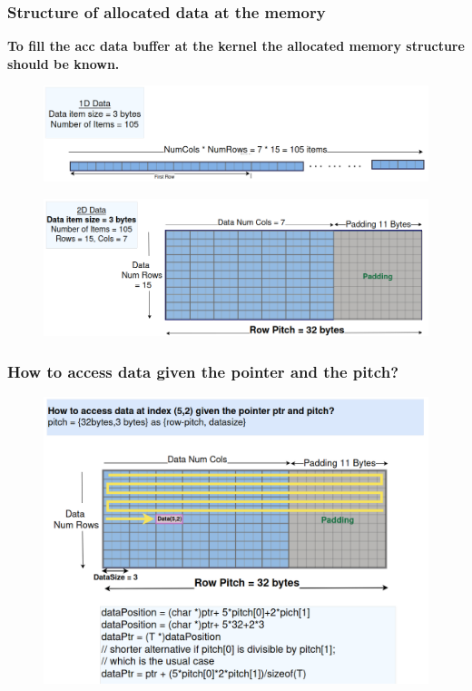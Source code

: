 \documentclass[9pt]{beamer}
\begin{document}
\begin{frame}[fragile]
\frametitle{Structure of allocated data at the memory}
\hspace{-0.4\baselineskip}
\textbf{To fill the acc data buffer at the kernel the allocated memory structure should be known.}
\begin{figure}
\hspace{-1.2\baselineskip}
   \centering
   \includegraphics[width=0.75\linewidth]{Screenshot from 2024-10-21 01-36-15.png}
   \label{fig:enter-label}
\end{figure}
\hspace{0.1\baselineskip}
\begin{figure}
\hspace{-1.1\baselineskip}
   \centering
   \includegraphics[width=0.75\linewidth]{Screenshot from 2024-10-01 17-30-50.png}
   \label{fig:enter-label}
\end{figure}
\end{frame}



\begin{frame}[fragile]
\frametitle{How to access data given the pointer and the pitch?}
\begin{figure}
    \centering
    \includegraphics[width=0.80\linewidth]{Screenshot from 2024-10-02 15-47-27.png}
\end{figure}

\end{frame}
\end{document}
